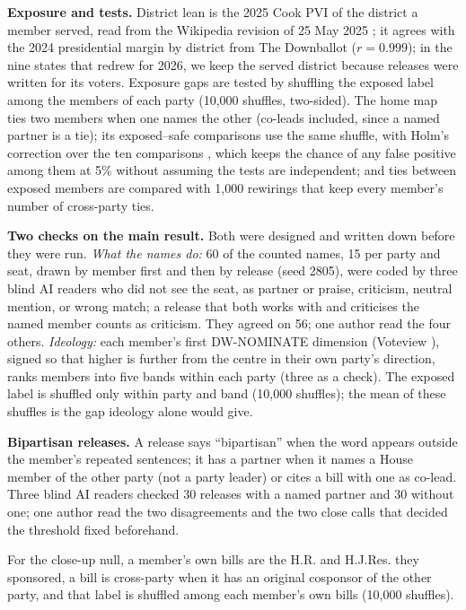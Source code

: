 \textbf{Exposure and tests.} District lean is the 2025 Cook PVI \cite{cook2025pvi} of the district a member served, read from the Wikipedia revision of 25 May 2025 \cite{wikipedia2025pvi}; it agrees with the 2024 presidential margin by district from The Downballot \cite{downballot2024} ($r = 0.999$); in the nine states that redrew for 2026, we keep the served district because releases were written for its voters. Exposure gaps are tested by shuffling the exposed label among the members of each party (10,000 shuffles, two-sided). The home map ties two members when one names the other (co-leads included, since a named partner is a tie); its exposed--safe comparisons use the same shuffle, with Holm's correction over the ten comparisons \cite{holm1979}, which keeps the chance of any false positive among them at 5\% without assuming the tests are independent; and ties between exposed members are compared with 1,000 rewirings that keep every member's number of cross-party ties.

\textbf{Two checks on the main result.} Both were designed and written down before they were run. \emph{What the names do:} 60 of the counted names, 15 per party and seat, drawn by member first and then by release (seed 2805), were coded by three blind AI readers who did not see the seat, as partner or praise, criticism, neutral mention, or wrong match; a release that both works with and criticises the named member counts as criticism. They agreed on 56; one author read the four others. \emph{Ideology:} each member's first DW-NOMINATE dimension (Voteview \cite{voteview2026}), signed so that higher is further from the centre in their own party's direction, ranks members into five bands within each party (three as a check). The exposed label is shuffled only within party and band (10,000 shuffles); the mean of these shuffles is the gap ideology alone would give.

\textbf{Bipartisan releases.} A release says ``bipartisan'' when the word appears outside the member's repeated sentences; it has a partner when it names a House member of the other party (not a party leader) or cites a bill with one as co-lead. Three blind AI readers checked 30 releases with a named partner and 30 without one; one author read the two disagreements and the two close calls that decided the threshold fixed beforehand.

For the close-up null, a member's own bills are the H.R. and H.J.Res. they sponsored, a bill is cross-party when it has an original cosponsor of the other party, and that label is shuffled among each member's own bills (10,000 shuffles).
